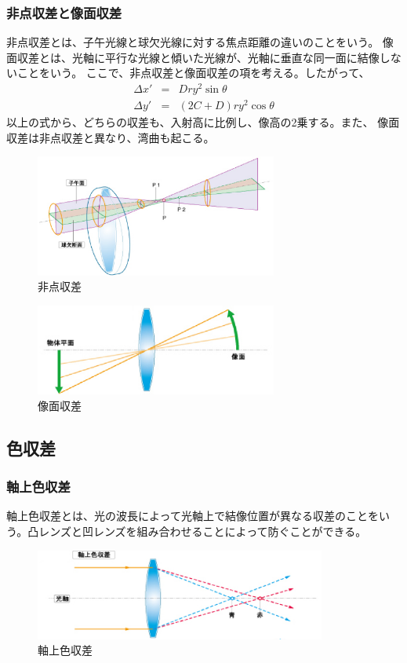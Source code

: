 \subsubsection{非点収差と像面収差}
非点収差とは、子午光線と球欠光線に対する焦点距離の違いのことをいう。
像面収差とは、光軸に平行な光線と傾いた光線が、光軸に垂直な同一面に結像しないことをいう。
ここで、非点収差と像面収差の項を考える。したがって、
\begin{eqnarray}
	\label{seidelx}
	\Delta x' & = & D r y^2 \sin \theta \\
	\label{seidely}
	\Delta y' & = & (2C+D)r y^2 \cos \theta 
\end{eqnarray}
以上の式から、どちらの収差も、入射高に比例し、像高の2乗する。また、
像面収差は非点収差と異なり、湾曲も起こる。
\begin{figure}[h]
	\centering
	\includegraphics[height=40mm]{image/hiten.png.eps}
	\caption{非点収差\ \cite{cite1}}
	\label{caption1}
\end{figure}
\begin{figure}[h]
	\centering
	\includegraphics[height=30mm]{image/zomen.png.eps}
	\caption{像面収差\ \cite{cite1}}
	\label{caption1}
\end{figure}

\subsection{色収差}
\subsubsection{軸上色収差}
軸上色収差とは、光の波長によって光軸上で結像位置が異なる収差のことをいう。凸レンズと凹レンズを組み合わせることによって防ぐことができる。
\begin{figure}[h]
	\centering
	\includegraphics[height=30mm]{image/jikujo.png.eps}
	\caption{軸上色収差\ \cite{cite1}}
	\label{caption1}
\end{figure}
